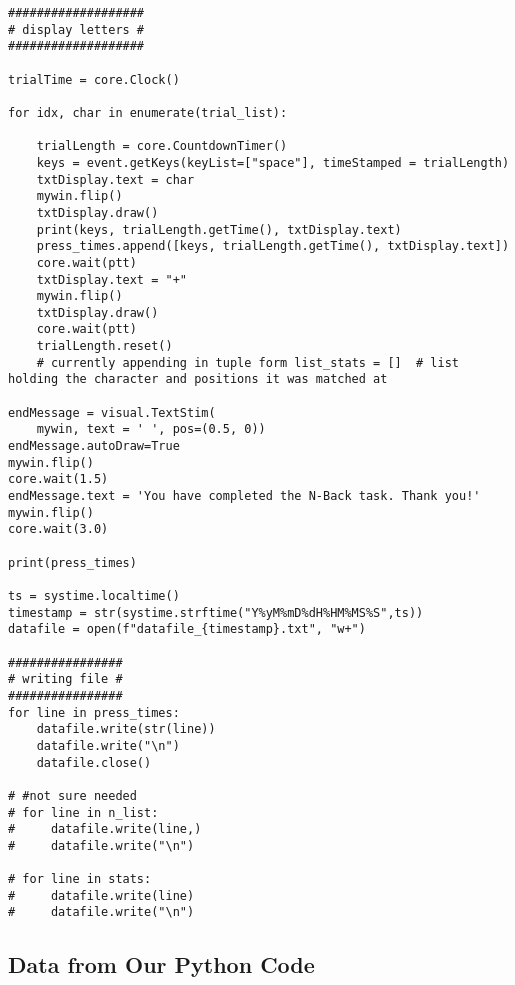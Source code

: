 \documentclass{article}
\begin{document}
\begin{verbatim}
###################
# display letters #
###################

trialTime = core.Clock()

for idx, char in enumerate(trial_list):

    trialLength = core.CountdownTimer()
    keys = event.getKeys(keyList=["space"], timeStamped = trialLength)
    txtDisplay.text = char
    mywin.flip()
    txtDisplay.draw()
    print(keys, trialLength.getTime(), txtDisplay.text)
    press_times.append([keys, trialLength.getTime(), txtDisplay.text])
    core.wait(ptt)
    txtDisplay.text = "+"
    mywin.flip()
    txtDisplay.draw()
    core.wait(ptt)
    trialLength.reset()
    # currently appending in tuple form list_stats = []  # list holding the character and positions it was matched at

endMessage = visual.TextStim(
    mywin, text = ' ', pos=(0.5, 0))
endMessage.autoDraw=True
mywin.flip()
core.wait(1.5)
endMessage.text = 'You have completed the N-Back task. Thank you!'
mywin.flip()
core.wait(3.0)

print(press_times)

ts = systime.localtime()
timestamp = str(systime.strftime("Y%yM%mD%dH%HM%MS%S",ts))
datafile = open(f"datafile_{timestamp}.txt", "w+")

################
# writing file #
################
for line in press_times:
    datafile.write(str(line))
    datafile.write("\n")
    datafile.close()

# #not sure needed
# for line in n_list:
#     datafile.write(line,)
#     datafile.write("\n")

# for line in stats:
#     datafile.write(line)
#     datafile.write("\n")

\end{verbatim}
\subsection{Data from Our Python Code}
\label{sec:orga50dd5a}
\end{document}
